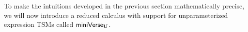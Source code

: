 

To make the intuitions developed in the previous section mathematically precise, we will now introduce a reduced calculus with support for unparameterized expression TSMs called $\mathsf{miniVerse}_\textbf{U}$. 



